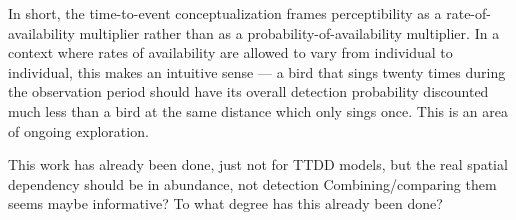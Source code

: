 \documentclass[useAMS,usenatbib,referee,12pt]{article}
\begin{document}
In short, the time-to-event conceptualization frames perceptibility as a rate-of-availability multiplier rather than as a probability-of-availability multiplier.  
In a context where rates of availability are allowed to vary from individual to individual, this makes an intuitive sense --- a bird that sings twenty times during the observation period should have its overall detection probability discounted much less than a bird at the same distance which only sings once.  
This is an area of ongoing exploration.



%
%


This work has already been done, just not for TTDD models, but the real spatial dependency should be in abundance, not detection
Combining/comparing them seems maybe informative?  To what degree has this already been done?



\end{document}
